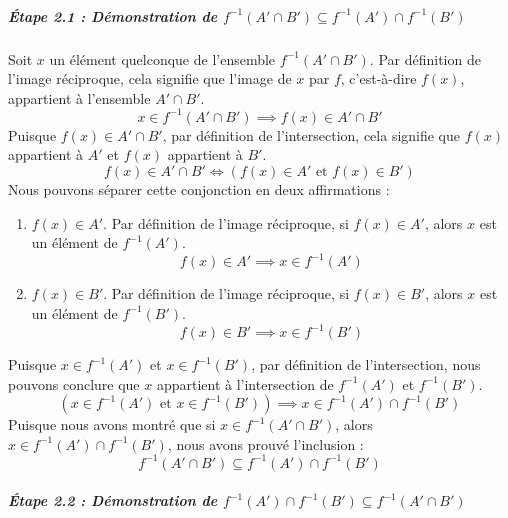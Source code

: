 \documentclass[12pt,a4paper]{report}
\begin{document}
\subparagraph{\texorpdfstring{Étape 2.1 : Démonstration de
\(f^{-1}(A' \cap B') \subseteq f^{-1}(A') \cap f^{-1}(B')\)}{Étape 2.1 : Démonstration de f\^{}\{-1\}(A\textquotesingle{} \textbackslash cap B\textquotesingle) \textbackslash subseteq f\^{}\{-1\}(A\textquotesingle) \textbackslash cap f\^{}\{-1\}(B\textquotesingle)}}\label{uxe9tape-2.1-duxe9monstration-de-f-1a-cap-b-subseteq-f-1a-cap-f-1b}

Soit \(x\) un élément quelconque de l'ensemble \(f^{-1}(A' \cap B')\).
Par définition de l'image réciproque, cela signifie que l'image de \(x\)
par \(f\), c'est-à-dire \(f(x)\), appartient à l'ensemble
\(A' \cap B'\).
\[x \in f^{-1}(A' \cap B') \implies f(x) \in A' \cap B'\] Puisque
\(f(x) \in A' \cap B'\), par définition de l'intersection, cela signifie
que \(f(x)\) appartient à \(A'\) et \(f(x)\) appartient à \(B'\).
\[f(x) \in A' \cap B' \iff (f(x) \in A' \text{ et } f(x) \in B')\] Nous
pouvons séparer cette conjonction en deux affirmations :

\begin{enumerate}
\def\labelenumi{\arabic{enumi}.}
\item
  \(f(x) \in A'\). Par définition de l'image réciproque, si
  \(f(x) \in A'\), alors \(x\) est un élément de \(f^{-1}(A')\).
  \[f(x) \in A' \implies x \in f^{-1}(A')\]
\item
  \(f(x) \in B'\). Par définition de l'image réciproque, si
  \(f(x) \in B'\), alors \(x\) est un élément de \(f^{-1}(B')\).
  \[f(x) \in B' \implies x \in f^{-1}(B')\]
\end{enumerate}

Puisque \(x \in f^{-1}(A')\) et \(x \in f^{-1}(B')\), par définition de
l'intersection, nous pouvons conclure que \(x\) appartient à
l'intersection de \(f^{-1}(A')\) et \(f^{-1}(B')\).
\[(x \in f^{-1}(A') \text{ et } x \in f^{-1}(B')) \implies x \in f^{-1}(A') \cap f^{-1}(B')\]
Puisque nous avons montré que si \(x \in f^{-1}(A' \cap B')\), alors
\(x \in f^{-1}(A') \cap f^{-1}(B')\), nous avons prouvé l'inclusion :
\[f^{-1}(A' \cap B') \subseteq f^{-1}(A') \cap f^{-1}(B')\]

\subparagraph{\texorpdfstring{Étape 2.2 : Démonstration de
\(f^{-1}(A') \cap f^{-1}(B') \subseteq f^{-1}(A' \cap B')\)}{Étape 2.2 : Démonstration de f\^{}\{-1\}(A\textquotesingle) \textbackslash cap f\^{}\{-1\}(B\textquotesingle) \textbackslash subseteq f\^{}\{-1\}(A\textquotesingle{} \textbackslash cap B\textquotesingle)}}\label{uxe9tape-2.2-duxe9monstration-de-f-1a-cap-f-1b-subseteq-f-1a-cap-b}
\end{document}
